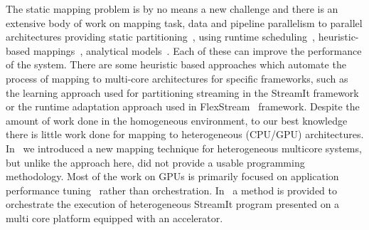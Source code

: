 \documentclass[final]{jfp1}
\begin{document}

The static mapping problem is by no means a new challenge and there is an extensive body
of work on mapping task, data and pipeline parallelism to
parallel architectures providing static
partitioning~\cite{kwok1999static,saraswat2007x10,subhlok1993exploiting}, using runtime scheduling~\cite{distributed1984dynamic}, heuristic-based
mappings~\cite{gordon2006exploiting}, analytical models~\cite{navarro2009analytical}. Each of these can improve the performance of the system.
There are some heuristic based approaches which automate the process of mapping to multi-core architectures for specific frameworks, such as 
the learning approach used for partitioning streaming in the StreamIt framework~\cite{wang2010partitioning} or the runtime adaptation 
approach used in FlexStream~\cite{hormati2009flextream} framework.
Despite the amount of work done in the homogeneous environment, to our best knowledge there is little work done for mapping to 
heterogeneous (CPU/GPU) architectures. In~\cite{cec} we introduced a new mapping technique for heterogeneous multicore systems, 
but unlike the approach here, did not provide a usable programming methodology.
Most of the work on GPUs is primarily focused on application performance 
tuning~\cite{agrawal2005optimizing} rather than orchestration.
In~\cite{udupa2009software} a method is provided to orchestrate the execution of heterogeneous StreamIt program presented 
on a multi core platform equipped with an accelerator.
\end{document}
